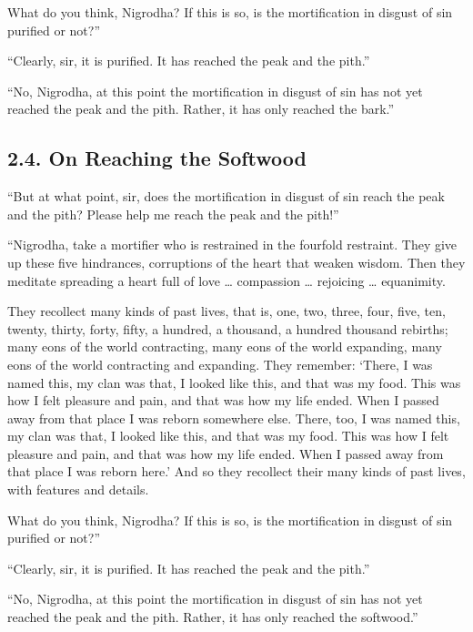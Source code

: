 \documentclass[12pt,openany]{book}%
\begin{document}
What do you think, Nigrodha? If this is so, is the mortification in disgust of sin purified or not?” 

“Clearly, sir, it is purified. It has reached the peak and the pith.” 

“No, Nigrodha, at this point the mortification in disgust of sin has not yet reached the peak and the pith. Rather, it has only reached the bark.” 

\subsection*{2.4. On Reaching the Softwood }

“But at what point, sir, does the mortification in disgust of sin reach the peak and the pith? Please help me reach the peak and the pith!” 

“Nigrodha, take a mortifier who is restrained in the fourfold restraint. They give up these five hindrances, corruptions of the heart that weaken wisdom. Then they meditate spreading a heart full of love … compassion … rejoicing … equanimity. 

They recollect many kinds of past lives, that is, one, two, three, four, five, ten, twenty, thirty, forty, fifty, a hundred, a thousand, a hundred thousand rebirths; many eons of the world contracting, many eons of the world expanding, many eons of the world contracting and expanding. They remember: ‘There, I was named this, my clan was that, I looked like this, and that was my food. This was how I felt pleasure and pain, and that was how my life ended. When I passed away from that place I was reborn somewhere else. There, too, I was named this, my clan was that, I looked like this, and that was my food. This was how I felt pleasure and pain, and that was how my life ended. When I passed away from that place I was reborn here.’ And so they recollect their many kinds of past lives, with features and details. 

What do you think, Nigrodha? If this is so, is the mortification in disgust of sin purified or not?” 

“Clearly, sir, it is purified. It has reached the peak and the pith.” 

“No, Nigrodha, at this point the mortification in disgust of sin has not yet reached the peak and the pith. Rather, it has only reached the softwood.” 
\end{document}
